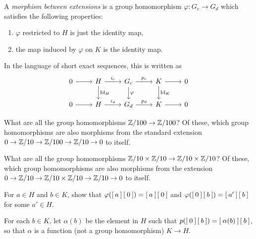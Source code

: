 \begin{definition}
  A \emph{morphism between extensions} is a group homomorphism $\varphi: G_c \rightarrow G_d$ which satisfies the following properties:
  \begin{enumerate}
    \item $\varphi$ restricted to $H$ is just the identity map,
    \item the map induced by $\varphi$ on $K$ is the identity map.
  \end{enumerate}

  In the language of short exact sequences, this is written as
  \begin{equation*}
    \begin{tikzcd}
      0 \ar[r] & H \ar[r,"i_c"] \ar[d,"\id_H"] &  G_c \ar[d,"\varphi"] \ar[r, "p_c"] & K \ar[r] \ar[d,"\id_K"]& 0 \\
      0 \ar[r] & H \ar[r,"i_d"] &  G_d  \ar[r, "p_d"] & K \ar[r] & 0
    \end{tikzcd}
  \end{equation*}
\end{definition}

\begin{qbox}
  What are all the group homomorphisms $\mathbb{Z}/100 \rightarrow \mathbb{Z}/100$?
  Of these, which group homomorphisms are also morphisms from the standard extension $0 \rightarrow \mathbb{Z}/10 \rightarrow \mathbb{Z}/100 \rightarrow \mathbb{Z}/10 \rightarrow 0$ to itself.
\end{qbox}

\begin{qbox}
  What are all the group homomorphisms $\mathbb{Z}/10 \times \mathbb{Z}/10 \rightarrow \mathbb{Z}/10 \times \mathbb{Z}/10$?
  Of these, which group homomorphisms are also morphisms from the extension $0 \rightarrow \mathbb{Z}/10 \rightarrow \mathbb{Z}/10 \times \mathbb{Z}/10 \rightarrow \mathbb{Z}/10 \rightarrow 0$ to itself.
\end{qbox}

\begin{qbox}
  For $a \in H$ and $b \in K$, show that $\varphi(\left[\: a \:\right]\left[\: 0 \:\right]) = \left[\: a \:\right]\left[\: 0 \:\right]$ and $\varphi(\left[\: 0 \:\right]\left[\: b \:\right]) = \left[\: a' \:\right]\left[\: b \:\right]$ for some $a' \in H$.
\end{qbox}
For each $b \in K$, let $\alpha(b)$ be the element in $H$ such that $p(\left[\: 0 \:\right]\left[\: b \:\right]) = \left[\: \alpha(b) \:\right]\left[\: b \:\right]$, so that $\alpha$ is a function (not a group homomorphism) $K \rightarrow H$.

